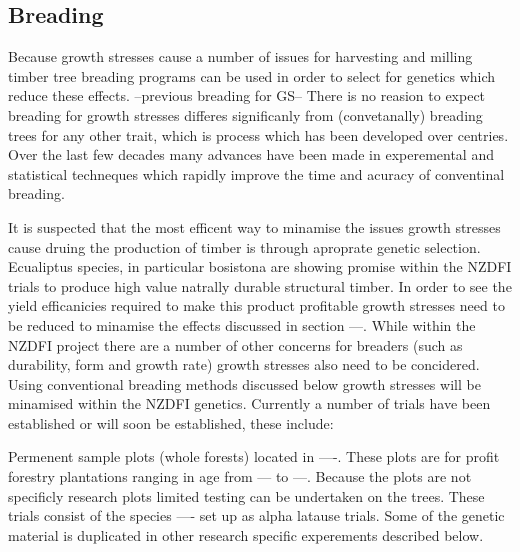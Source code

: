 \documentclass{article}
\begin{document}
%
%




\subsection{Breading}
Because growth stresses cause a number of issues for harvesting and milling
timber tree breading programs can be used in order to select for genetics which
reduce these effects. --previous breading for GS-- There is no reasion to
expect  breading for growth stresses differes significanly from (convetanally)
breading trees for any other trait, which is process which has been developed
over centries. Over the last few decades many advances have been made in
experemental and statistical techneques which rapidly improve the time and
acuracy of conventinal breading.

It is suspected that the most efficent way to minamise the issues growth
stresses cause druing the production of timber is through aproprate genetic
selection. Ecualiptus species, in particular bosistona are showing promise
within the NZDFI trials to produce high value natrally durable structural
timber. In order to see the yield efficanicies required to make this
product profitable growth stresses need to be reduced to minamise the
effects discussed in section ---. While within the NZDFI project there are a
number of other concerns for breaders (such as durability, form and growth
rate) growth stresses also need to be concidered. Using conventional breading
methods discussed below growth stresses will be minamised within the NZDFI
genetics. Currently a number of trials have been established or will soon be
established, these include:

Permenent sample plots (whole forests) located in ----. These plots are for
profit forestry plantations ranging in age from --- to ---. Because the plots
are not specificly research plots limited testing can be undertaken on the
trees. These trials consist of the species ---- set up as alpha latause trials.
Some of the genetic material is duplicated in other research specific
experements described below.
\end{document}
